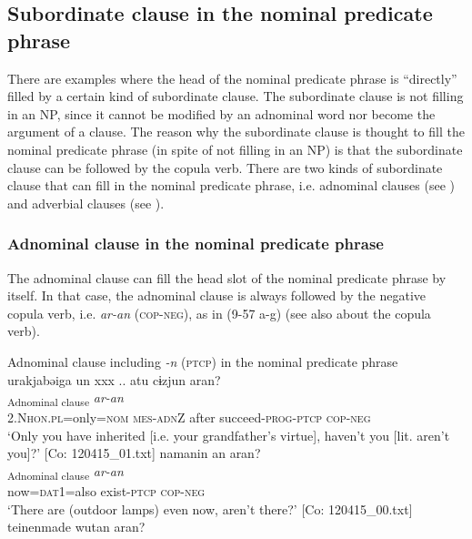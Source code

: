 \subsection{Subordinate clause in the nominal predicate phrase}\label{sec:9.3.2}

There are examples where the head of the nominal predicate phrase is “directly” filled by a certain kind of subordinate clause. The subordinate clause is not filling in an NP, since it cannot be modified by an adnominal word nor become the argument of a clause. The reason why the subordinate clause is thought to fill the nominal predicate phrase (in spite of not filling in an NP) is that the subordinate clause can be followed by the copula verb. There are two kinds of subordinate clause that can fill in the nominal predicate phrase, i.e. adnominal clauses (see ) and adverbial clauses (see ).

\subsubsection{Adnominal clause in the nominal predicate phrase}\label{sec:9.3.2.1}

The adnominal clause can fill the head slot of the nominal predicate phrase by itself. In that case, the adnominal clause is always followed by the negative copula verb, i.e. \textit{ar-an} (\textsc{cop}-\textsc{neg}), as in (9-57 a-g) (see also  about the copula verb).

\ea   
\exi{} Adnominal clause including \textit{-n} (\textsc{ptcp}) in the nominal predicate phrase \label{ex:9.57}
\ea %
 \glll  urakjabəiga  un  {xxx ..}  atu   cɨzjun  aran?\\
      [\textit{urakja=bəi=ga}  \textit{u-n} {}  \textit{atu}  \textit{cɨg-tur-n}]\textsubscript{Adnominal clause}  \textit{ar-an}\\
      2.N\textsc{hon}.\textsc{pl}=only=\textsc{nom}  \textsc{mes}-\textsc{adn}Z   {} after  succeed-\textsc{prog}-\textsc{ptcp}  \textsc{cop}-\textsc{neg}\\
      \glt       ‘Only you have inherited [i.e. your grandfather’s virtue], haven’t you [lit. aren’t you]?’ [Co: 120415\_01.txt]
  \ex{}%
    \glll  namanin  an  aran?\\
      [\textit{nama=n=n}  \textit{ar-n}]\textsubscript{Adnominal clause}  \textit{ar-an}\\
      now=\textsc{dat}1=also  exist-\textsc{ptcp}  \textsc{cop}-\textsc{neg}\\
      \glt       ‘There are (outdoor lamps) even now, aren’t there?’ [Co: 120415\_00.txt]
\ex \label{ex:9.57c} %
    \glll  {\textbar}teinenmade{\textbar}  wutan  aran?\\
      [\textit{teinen=made}  {\textit{wur-tar-n}]\textsubscript{Adnominal clause}} \textit{ar-an}\\
      retirement.age=\textsc{lmt}  exist-\textsc{pst}-\textsc{ptcp}  \textsc{cop}-\textsc{neg}\\
      \glt       ‘(He) was (at work) until the retirement age, wasn’t (he)?’ [Co: 110328\_00.txt]


